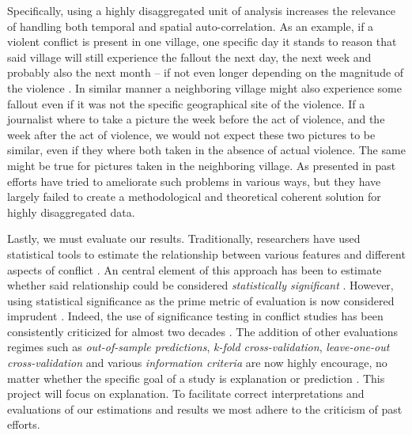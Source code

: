 \documentclass[a4paper]{article}
\begin{document}
Specifically, using a highly disaggregated unit of analysis increases the relevance of handling both temporal and spatial auto-correlation. As an example, if a violent conflict is present in one village, one specific day it stands to reason that said village will still experience the fallout the next day, the next week and probably also the next month -- if not even longer depending on the magnitude of the violence \cite[15-17]{SPECIALE}. In similar manner a neighboring village might also experience some fallout even if it was not the specific geographical site of the violence. If a journalist where to take a picture the week before the act of violence, and the week after the act of violence, we would not expect these two pictures to be similar, even if they where both taken in the absence of actual violence. The same might be true for pictures taken in the neighboring village. As presented in \cite{SPECIALE} past efforts have tried to ameliorate such problems in various ways, but they have largely failed to create a methodological and theoretical coherent solution for highly disaggregated data.\par 

Lastly, we must evaluate our results. Traditionally, researchers have used statistical tools to estimate the relationship between various features and different aspects of conflict \citep[8]{chadefaux2017conflict}. An central element of this approach has been to estimate whether said relationship could be considered \emph{statistically significant} \citep[363-364]{Ward_Greenhill_Bakke_2010}. However, using statistical significance as the prime metric of evaluation is now considered imprudent \citep{Ward_Greenhill_Bakke_2010, Schrodt_2014, chadefaux2017conflict}. Indeed, the use of significance testing in conflict studies has been consistently criticized for almost two decades \citep{king_zeng_2001b, Ward_Greenhill_Bakke_2010, Goldstone_2010, Schrodt_2014, chadefaux2017conflict}. The addition of other evaluations regimes such as \emph{out-of-sample predictions}, \emph{k-fold cross-validation}, \emph{leave-one-out cross-validation} and various \emph{information criteria} are now highly encourage, no matter whether the specific goal of a study is explanation or prediction \citep{Ward_Greenhill_Bakke_2010, Schrodt_2014, Mcelreath_2018}. This project will focus on explanation. To facilitate correct interpretations and evaluations of our estimations and results we most adhere to the criticism of past efforts.\par 
\end{document}
